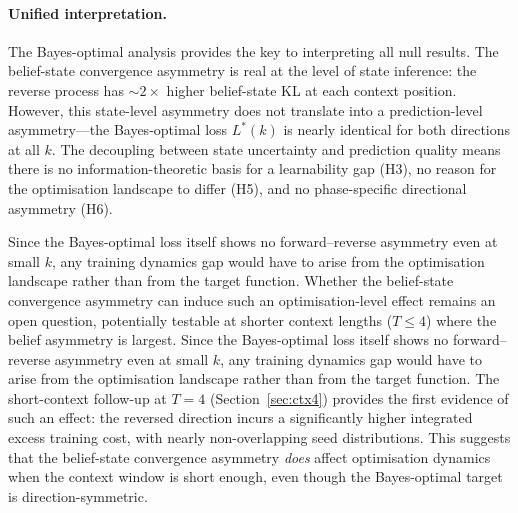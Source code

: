 \documentclass[11pt]{article}
\newcommand{\claude}[1]{{\color{red}\textsf{#1}}}
\newcommand{\old}[1]{{\color{gray}#1}}
\begin{document}

\paragraph{Unified interpretation.}
The Bayes-optimal analysis provides the key to interpreting all null results.  The belief-state convergence asymmetry is real at the level of state inference: the reverse process has $\sim 2\times$ higher belief-state KL at each context position.  However, this state-level asymmetry does not translate into a prediction-level asymmetry---the Bayes-optimal loss $L^*(k)$ is nearly identical for both directions at all $k$.  The decoupling between state uncertainty and prediction quality means there is no information-theoretic basis for a learnability gap (H3), no reason for the optimisation landscape to differ (H5), and no phase-specific directional asymmetry (H6).

\old{Since the Bayes-optimal loss itself shows no forward--reverse asymmetry even at small $k$, any training dynamics gap would have to arise from the optimisation landscape rather than from the target function.  Whether the belief-state convergence asymmetry can induce such an optimisation-level effect remains an open question, potentially testable at shorter context lengths ($T \le 4$) where the belief asymmetry is largest.} \claude{Since the Bayes-optimal loss itself shows no forward--reverse asymmetry even at small $k$, any training dynamics gap would have to arise from the optimisation landscape rather than from the target function.  The short-context follow-up at $T = 4$ (Section~\ref{sec:ctx4}) provides the first evidence of such an effect: the reversed direction incurs a significantly higher integrated excess training cost, with nearly non-overlapping seed distributions.  This suggests that the belief-state convergence asymmetry \emph{does} affect optimisation dynamics when the context window is short enough, even though the Bayes-optimal target is direction-symmetric.}
\end{document}
